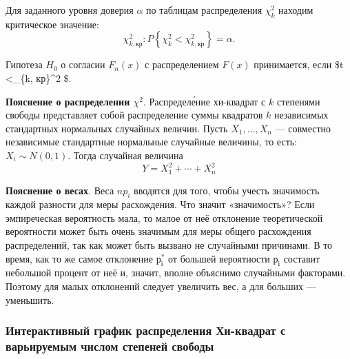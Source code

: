 \documentclass[11pt]{article}
\def\lt{<}
\begin{document}
Для заданного уровня доверия \(\alpha\) по таблицам распределения
\(\chi_k^2\) находим критическое значение: \[
\chi_{k, кр}^2: P\left\{\chi_k^2 \lt \chi_{k,кр}^2\right\} = \alpha.
\]

Гипотеза \(H_0\) о согласии \(F_n(x)\) с распределением \(F(x)\)
принимается, если \$t \lt \chi\_\{k, кр\}\^{}2 \$.

\textbf{Пояснение о распределении \(\chi^2\)}. Распределе́ние хи-квадрат
с \(k\) степенями свободы представляет собой распределение суммы
квадратов \(k\) независимых стандартных нормальных случайных величин.
Пусть \(X_1, \ldots, X_n\) --- совместно независимые стандартные
нормальные случайные величины, то есть: \(X_i \sim N(0,1)\). Тогда
случайная величина \[
Y = X_1^2 + \cdots + X_n^2
\]

\textbf{Пояснение о весах}. Веса \(np_i\) вводятся для того, чтобы
учесть значимость каждой разности для меры расхождения. Что значит
«значимость»? Если эмпиреческая вероятность мала, то малое от неё
отклонение теоретической вероятности может быть очень значимым для меры
общего расхождения распределений, так как может быть вызвано не
случайными причинами. В то время, как то же самое отклонение \(р^*_і\)
от большей вероятности \(р_і\) составит небольшой процент от неё и,
значит, вполне объяснимо случайными факторами. Поэтому для малых
отклонений следует увеличить вес, а для больших --- уменьшить.

    \subsubsection{Интерактивный график распределения Хи-квадрат с
варьируемым числом степеней
свободы}\label{ux438ux43dux442ux435ux440ux430ux43aux442ux438ux432ux43dux44bux439-ux433ux440ux430ux444ux438ux43a-ux440ux430ux441ux43fux440ux435ux434ux435ux43bux435ux43dux438ux44f-ux445ux438-ux43aux432ux430ux434ux440ux430ux442-ux441-ux432ux430ux440ux44cux438ux440ux443ux435ux43cux44bux43c-ux447ux438ux441ux43bux43eux43c-ux441ux442ux435ux43fux435ux43dux435ux439-ux441ux432ux43eux431ux43eux434ux44b}
\end{document}
